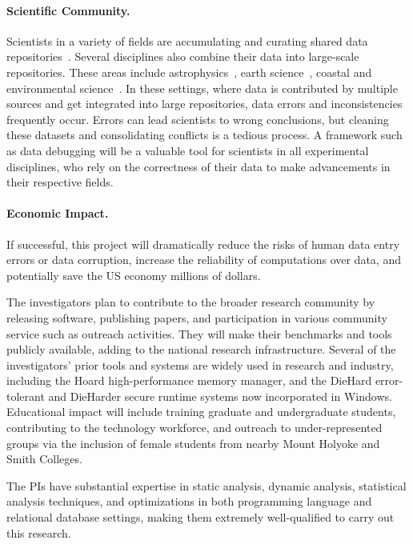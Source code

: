 \paragraph{Scientific Community.} %
\label{par:scientific}
Scientists in a variety of fields are accumulating and curating shared
data repositories~\cite{uniprot,naturemap}. Several disciplines also
combine their data into large-scale repositories. These areas include
astrophysics~\cite{skysurvey}, earth science~\cite{iris,unavco},
coastal and environmental science~\cite{wagda}. In these settings,
where data is contributed by multiple sources and get integrated into
large repositories, data errors and inconsistencies frequently
occur. Errors can lead scientists to wrong conclusions, but cleaning
these datasets and consolidating conflicts is a tedious process. A
framework such as data debugging will be a valuable tool for
scientists in all experimental disciplines, who rely on the
correctness of their data to make advancements in their respective
fields.

\paragraph{Economic Impact.}
If successful, this project will dramatically reduce the risks of
human data entry errors or data corruption, increase the reliability
of computations over data, and potentially save the US economy
millions of dollars.


The investigators plan to contribute to the broader research community
by releasing software, publishing papers, and participation in various
community service such as outreach activities.  They will make their
benchmarks and tools publicly available, adding to the national
research infrastructure. Several of the investigators' prior tools and
systems are widely used in research and industry, including the Hoard
high-performance memory manager, and the DieHard error-tolerant and
DieHarder secure runtime systems now incorporated in
Windows. Educational impact will include training graduate and
undergraduate students, contributing to the technology workforce, and
outreach to under-represented groups via the inclusion of female
students from nearby Mount Holyoke and Smith Colleges.

The PIs have substantial expertise in static analysis, dynamic
analysis, statistical analysis techniques, and optimizations in both
programming language and relational database settings, making them
extremely well-qualified to carry out this research.

